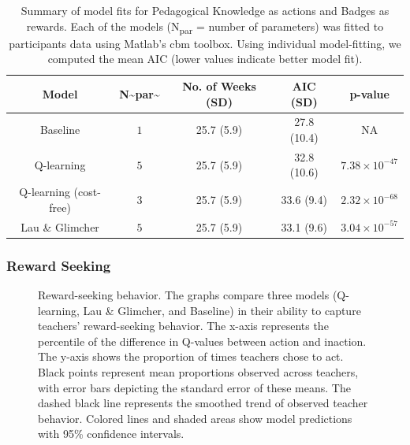 \documentclass[
  number,
  preprint,
  3p,
  onecolumn]{elsarticle}
\begin{document}
\begin{longtable}{ccccc}

\caption{\label{tbl-model-summary}Summary of model fits for Pedagogical
Knowledge as actions and Badges as rewards. Each of the models
(N\textsubscript{par} = number of parameters) was fitted to participants
data using Matlab's cbm toolbox. Using individual model-fitting, we
computed the mean AIC (lower values indicate better model fit).}

\tabularnewline

\toprule
Model & N\textasciitilde{}par\textasciitilde{} & No. of Weeks (SD) & AIC (SD) & p-value \\ 
\midrule\addlinespace[2.5pt]
Baseline & $1$ & 25.7 (5.9) & 27.8 (10.4) & NA \\ 
Q-learning & $5$ & 25.7 (5.9) & 32.8 (10.6) & $7.38 \times 10^{-47}$ \\ 
Q-learning (cost-free) & $3$ & 25.7 (5.9) & 33.6 (9.4) & $2.32 \times 10^{-68}$ \\ 
Lau \& Glimcher & $5$ & 25.7 (5.9) & 33.1 (9.6) & $3.04 \times 10^{-57}$ \\ 
\bottomrule

\end{longtable}

\subsubsection{Reward Seeking}\label{reward-seeking}

\begin{figure}


\caption{\label{fig-reward-seeking}Reward-seeking behavior. The graphs
compare three models (Q-learning, Lau \& Glimcher, and Baseline) in
their ability to capture teachers' reward-seeking behavior. The x-axis
represents the percentile of the difference in Q-values between action
and inaction. The y-axis shows the proportion of times teachers chose to
act. Black points represent mean proportions observed across teachers,
with error bars depicting the standard error of these means. The dashed
black line represents the smoothed trend of observed teacher behavior.
Colored lines and shaded areas show model predictions with 95\%
confidence intervals.}

\end{figure}%
\end{document}
